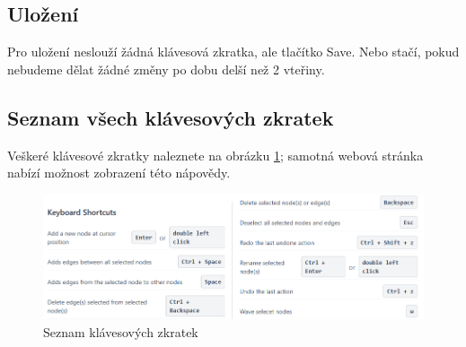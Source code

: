 \subsection{Uložení}
Pro uložení neslouží žádná klávesová zkratka, ale tlačítko Save. Nebo stačí, pokud nebudeme dělat žádné změny po dobu delší než 2 vteřiny. 
\subsection{Seznam všech klávesových zkratek}
\label{seznam}
Veškeré klávesové zkratky naleznete na obrázku \ref{fig:shortcuts}; samotná webová stránka nabízí možnost zobrazení této nápovědy.
\begin{figure}[h]
    \centering
    \includegraphics[width=1.1\linewidth]{Images/shortcuts.png}
    \caption{Seznam klávesových zkratek}
    \label{fig:shortcuts}
\end{figure}
